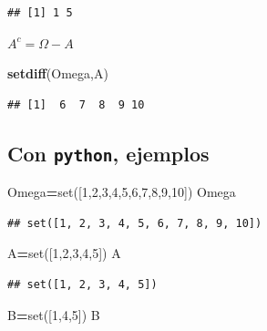 \documentclass[]{book}
\newenvironment{Shaded}{\begin{snugshade}}{\end{snugshade}}
\newcommand{\BuiltInTok}[1]{#1}
\newcommand{\DecValTok}[1]{\textcolor[rgb]{0.00,0.00,0.81}{#1}}
\newcommand{\KeywordTok}[1]{\textcolor[rgb]{0.13,0.29,0.53}{\textbf{#1}}}
\newcommand{\NormalTok}[1]{#1}
\newcommand{\OperatorTok}[1]{\textcolor[rgb]{0.81,0.36,0.00}{\textbf{#1}}}
\begin{document}
\begin{verbatim}
## [1] 1 5
\end{verbatim}

\(A^c=\Omega-A\)

\begin{Shaded}
\begin{Highlighting}[]
\KeywordTok{setdiff}\NormalTok{(Omega,A)}
\end{Highlighting}
\end{Shaded}

\begin{verbatim}
## [1]  6  7  8  9 10
\end{verbatim}

\hypertarget{con-python-ejemplos}{%
\subsection{\texorpdfstring{Con \texttt{python}, ejemplos}{Con python, ejemplos}}\label{con-python-ejemplos}}

\begin{Shaded}
\begin{Highlighting}[]
\NormalTok{Omega}\OperatorTok{=}\BuiltInTok{set}\NormalTok{([}\DecValTok{1}\NormalTok{,}\DecValTok{2}\NormalTok{,}\DecValTok{3}\NormalTok{,}\DecValTok{4}\NormalTok{,}\DecValTok{5}\NormalTok{,}\DecValTok{6}\NormalTok{,}\DecValTok{7}\NormalTok{,}\DecValTok{8}\NormalTok{,}\DecValTok{9}\NormalTok{,}\DecValTok{10}\NormalTok{])}
\NormalTok{Omega}
\end{Highlighting}
\end{Shaded}

\begin{verbatim}
## set([1, 2, 3, 4, 5, 6, 7, 8, 9, 10])
\end{verbatim}

\begin{Shaded}
\begin{Highlighting}[]
\NormalTok{A}\OperatorTok{=}\BuiltInTok{set}\NormalTok{([}\DecValTok{1}\NormalTok{,}\DecValTok{2}\NormalTok{,}\DecValTok{3}\NormalTok{,}\DecValTok{4}\NormalTok{,}\DecValTok{5}\NormalTok{])}
\NormalTok{A}
\end{Highlighting}
\end{Shaded}

\begin{verbatim}
## set([1, 2, 3, 4, 5])
\end{verbatim}

\begin{Shaded}
\begin{Highlighting}[]
\NormalTok{B}\OperatorTok{=}\BuiltInTok{set}\NormalTok{([}\DecValTok{1}\NormalTok{,}\DecValTok{4}\NormalTok{,}\DecValTok{5}\NormalTok{])}
\NormalTok{B}
\end{Highlighting}
\end{Shaded}
\end{document}
